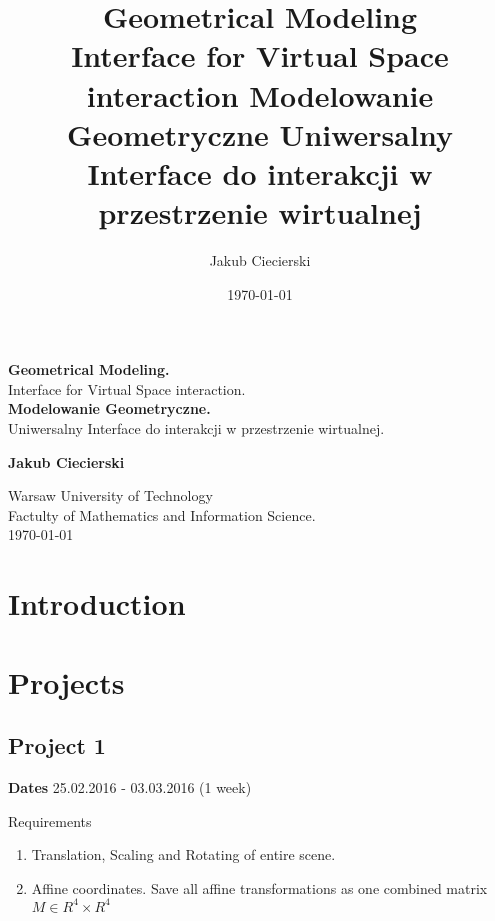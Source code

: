 \documentclass{book}
\title{
    {\bf Geometrical Modeling} \\ Interface for Virtual Space interaction    \vspace{50pt} {\bf Modelowanie Geometryczne} Uniwersalny Interface do interakcji w przestrzenie wirtualnej
}
\author{Jakub Ciecierski}
\date{\today}
\begin{document}
\begin{titlepage}
    \begin{center}

            \textbf{\huge  Geometrical Modeling.} \\ {\huge Interface for Virtual Space interaction.} \\ [0.5cm]
            
            \textbf{\huge  Modelowanie Geometryczne.} \\ {\huge Uniwersalny Interface do interakcji w przestrzenie wirtualnej.} \\ [0.5cm]
            
            \vspace*{\fill}

            \textbf{\large Jakub Ciecierski}

            \vspace*{\fill}
            
            \textnormal{\large Warsaw University of Technology \\ Factulty of Mathematics and Information Science. \\ \today}

    \end{center}
\end{titlepage}

\tableofcontents









\chapter*{Introduction}

\chapter{Projects}

\section{Project 1}
{\bf Dates} 25.02.2016 - 03.03.2016 (1 week)

Requirements
\begin{enumerate}
    \item Translation, Scaling and Rotating of entire scene.
    \item Affine coordinates. Save all affine transformations as one combined matrix $M \in R^4 \times R^4$
\end{enumerate}

\begin{thebibliography}{1}
    
    
\end{thebibliography}
\end{document}
